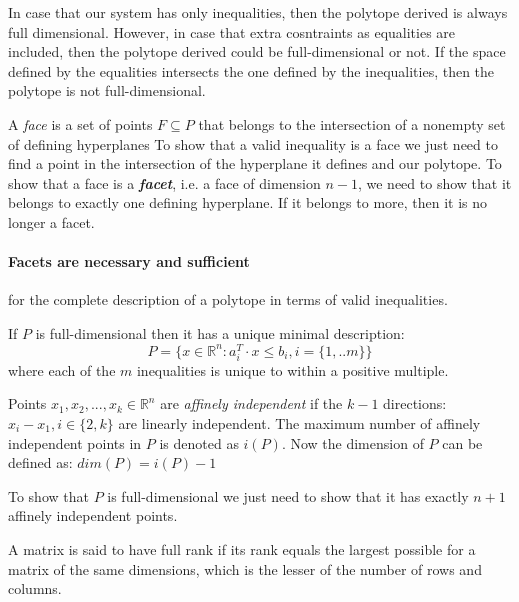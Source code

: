    In case that our system has only inequalities, 
   then the polytope derived is always full dimensional.
   However, in case that extra cosntraints as equalities
   are included, then the polytope derived could be 
   full-dimensional or not. 
   If the space defined by the equalities intersects the one 
   defined by the inequalities, then the polytope is not full-dimensional.

   
   A \textit{face} is a set of points $ F \subseteq P$ that belongs 
   to the intersection of a nonempty set of defining hyperplanes 
   To show that a valid inequality is a face we just need to 
   find a point in the intersection of the hyperplane it defines
   and our polytope. 
   To show that a face is a \textit{\textbf{facet}}, 
   i.e. a face of dimension $n -1$,
   we need to show that it belongs to exactly one defining hyperplane.
   If it belongs to more, then it is no longer a facet.

   \paragraph{Facets are necessary and sufficient} for the complete description of a polytope 
   in terms of valid inequalities.




      If $P$ is full-dimensional then it has a unique minimal description: 
      \begin{equation}
         P = \{ x \in \mathbb{R}^n : a_{i}^T \cdot x \leq b_{i}, i = \{1, ..m\} \}
      \end{equation}
      where each of the $m$ inequalities is unique to within a positive multiple.
   



   Points $ x_{1}, x_{2}, ... , x_{k} \in \mathbb{R}^n$ are \textit{affinely independent}
   if the $k-1$ directions: 
   $x_{i} - x_{1}, i \in \{2, k\}$
   are linearly independent. 
   The maximum number of affinely independent points in $P$ is denoted as $i(P)$. 
   Now the dimension of $P$ can be defined as:
   $dim(P) = i(P) - 1$

   To show that $P$ is full-dimensional we just need to 
   show that it has exactly $n+1$ affinely independent points. 

   A matrix is said to have full rank if its rank equals the largest possible for a matrix of the same dimensions, which is the lesser of the number of rows and columns. 







   


